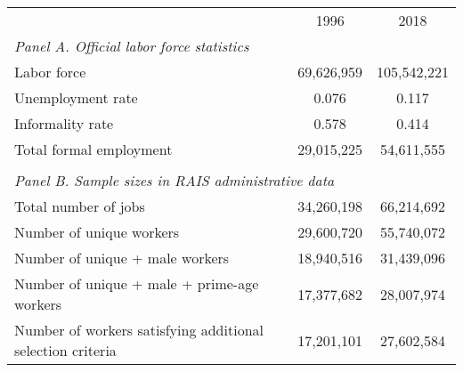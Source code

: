 \begin{tabular}{lcc}
   &  & \tabularnewline
  \hline
  \hline
   & 1996 & 2018\tabularnewline
  \hline
  \multicolumn{3}{l}{\emph{Panel A. Official labor force statistics}}\tabularnewline
  Labor force & 69,626,959 & 105,542,221\tabularnewline
  Unemployment rate & 0.076 & 0.117\tabularnewline
  Informality rate & 0.578 & 0.414\tabularnewline
  Total formal employment & 29,015,225 & 54,611,555\tabularnewline
   &  & \tabularnewline
  \multicolumn{3}{l}{\emph{Panel B. Sample sizes in RAIS administrative data}}\tabularnewline
  Total number of jobs & 34,260,198 & 66,214,692\tabularnewline
  Number of unique workers & 29,600,720 & 55,740,072\tabularnewline
  Number of unique + male workers & 18,940,516 & 31,439,096\tabularnewline
  Number of unique + male + prime-age workers & 17,377,682 & 28,007,974\tabularnewline
  Number of workers satisfying additional selection criteria & 17,201,101 & 27,602,584\tabularnewline
  \hline
\end{tabular}
